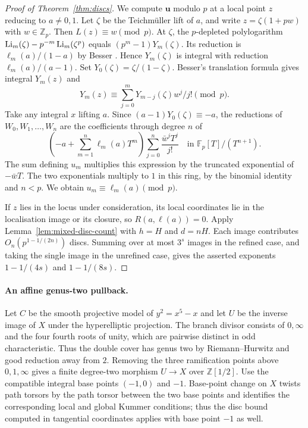 \begin{proof}[Proof of Theorem~\ref{thm:discs}]
We compute $\boldsymbol u$ modulo $p$ at a local point $z$ reducing
to $a\ne0,1$. Let $\zeta$ be the Teichm\"uller lift of $a$, and write
$z=\zeta(1+pw)$ with $w\in\mathbb Z_p$. Then
$L(z)\equiv w\pmod p$. At $\zeta$, the $p$-depleted polylogarithm
$\operatorname{Li}_m(\zeta)-p^{-m}\operatorname{Li}_m(\zeta^p)$
equals $(p^m-1)Y_m(\zeta)$. Its reduction is
$\ell_m(a)/(1-a)$ by Besser \cite[Proposition~2.1]{Besser}. Hence
$Y_m(\zeta)$ is integral with reduction $\ell_m(a)/(a-1)$.
Set $Y_0(\zeta)=\zeta/(1-\zeta)$. Besser's translation formula
\cite[Proposition~2.3]{Besser} gives integral $Y_m(z)$ and
\[
 Y_m(z)\equiv\sum_{j=0}^m Y_{m-j}(\zeta)w^j/j!\pmod p .
\]
Take any integral $x$ lifting $a$. Since $(a-1)Y_0(\zeta)\equiv-a$,
the reductions of $W_0,W_1,\ldots,W_n$ are the coefficients through
degree $n$ of
\[
 \left(-a+\sum_{m=1}^n\ell_m(a)T^m\right)
                 \sum_{j=0}^n\frac{\bar w^j T^j}{j!}
                \quad\text{in }\mathbb F_p[T]/(T^{n+1}).
\]
The sum defining $u_m$ multiplies this expression by the truncated
exponential of $-\bar w T$. The two exponentials multiply to $1$
in this ring, by the binomial identity and $n<p$. We obtain
$u_m\equiv\ell_m(a)\pmod p$.

If $z$ lies in the locus under consideration, its local coordinates lie
in the localisation image or its closure, so
$R(a,\boldsymbol\ell(a))=0$. Apply Lemma~\ref{lem:mixed-disc-count} with
$h=H$ and $d=nH$. Each image contributes $O_n(p^{1-1/(2n)})$ discs.
Summing over at most $3^s$ images in the refined case, and taking the
single image in the unrefined case, gives the asserted exponents
$1-1/(4s)$ and $1-1/(8s)$.
\end{proof}

\paragraph{An affine genus-two pullback.}
Let $C$ be the smooth projective model of $y^2=x^5-x$ and let $U$ be
the inverse image of $X$ under the hyperelliptic projection. The branch
divisor consists of $0,\infty$ and the four fourth roots of unity,
which are pairwise distinct in odd characteristic. Thus the double
cover has genus two by Riemann--Hurwitz and good reduction away from
$2$. Removing the three ramification points above $0,1,\infty$ gives
a finite degree-two morphism $U\to X$ over $\mathbb Z[1/2]$.
Use the compatible integral base points $(-1,0)$ and $-1$. Base-point
change on $X$ twists path torsors by the path torsor between the two
base points and identifies the corresponding local and global Kummer
conditions; thus the disc bound computed in tangential coordinates
applies with base point $-1$ as well.

